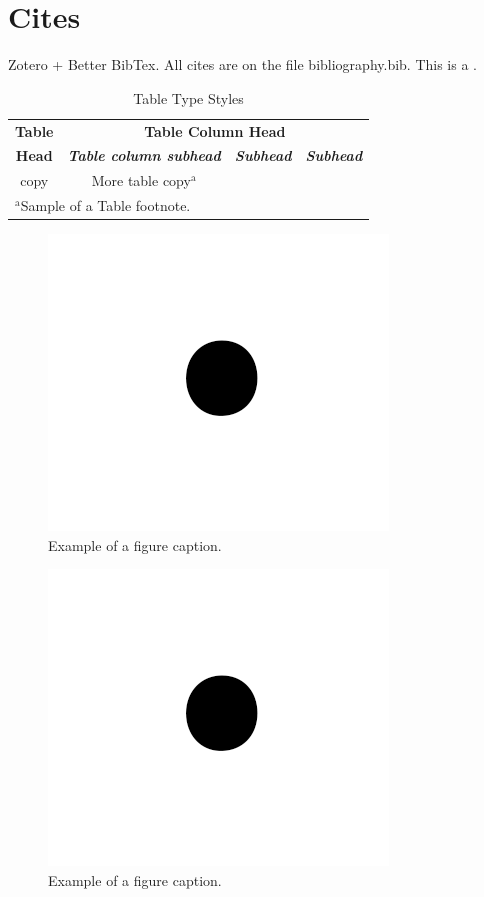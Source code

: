 \documentclass[conference]{IEEEtran}
\begin{document}
\section{Cites}\label{cites}

Zotero + Better BibTex. All cites are on the file bibliography.bib. This
is a \cite{djangoproject}.

\begin{table}[htbp]
\caption{Table Type Styles}
\begin{center}
\begin{tabular}{|c|c|c|c|}
\hline
\textbf{Table}&\multicolumn{3}{|c|}{\textbf{Table Column Head}} \\
\cline{2-4} 
\textbf{Head} & \textbf{\textit{Table column subhead}}& \textbf{\textit{Subhead}}& \textbf{\textit{Subhead}} \\
\hline
copy& More table copy$^{\mathrm{a}}$& &  \\
\hline
\multicolumn{4}{l}{$^{\mathrm{a}}$Sample of a Table footnote.}
\end{tabular}
\label{tab1}
\end{center}
\end{table}

\begin{figure}
\hypertarget{fig1}{%
\centering
\includegraphics{img/fig1.png}
\caption{Example of a figure caption.}\label{fig1}
}
\end{figure}

\begin{figure}[htbp]
\centerline{\includegraphics{img/fig1.png}}
\caption{Example of a figure caption.}
\label{fig}
\end{figure}
\end{document}
